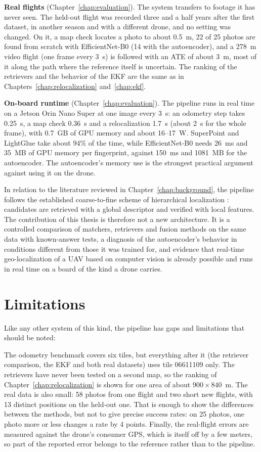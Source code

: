 \documentclass[english, Lau, oneside]{sapthesis}%
\begin{document}
\textbf{Real flights} (Chapter~\ref{chap:evaluation}). The system transfers to footage it has never seen. The held-out flight was recorded three and a half years after the first dataset, in another season and with a different drone, and no setting was changed. On it, a map check locates a photo to about 0.5~m, 22 of 25 photos are found from scratch with EfficientNet-B0 (14 with the autoencoder), and a 278~m video flight (one frame every 3~s) is followed with an ATE of about 3~m, most of it along the path where the reference itself is uncertain. The ranking of the retrievers and the behavior of the EKF are the same as in Chapters~\ref{chap:relocalization} and~\ref{chap:ekf}.

\textbf{On-board runtime} (Chapter~\ref{chap:evaluation}). The pipeline runs in real time on a Jetson Orin Nano Super at one image every 3~s: an odometry step takes 0.25~s, a map check 0.36~s and a relocalization 1.7~s (about 2~s for the whole frame), with 0.7~GB of GPU memory and about 16--17~W. SuperPoint and LightGlue take about 94\% of the time, while EfficientNet-B0 needs 26~ms and 35~MB of GPU memory per fingerprint, against 150~ms and 1081~MB for the autoencoder. The autoencoder's memory use is the strongest practical argument against using it on the drone.

In relation to the literature reviewed in Chapter~\ref{chap:background}, the pipeline follows the established coarse-to-fine scheme of hierarchical localization \citep{sarlin2019hloc}: candidates are retrieved with a global descriptor and verified with local features. The contribution of this thesis is therefore not a new architecture. It is a controlled comparison of matchers, retrievers and fusion methods on the same data with known-answer tests, a diagnosis of the autoencoder's behavior in conditions different from those it was trained for, and evidence that real-time geo-localization of a UAV based on computer vision is already possible and runs in real time on a board of the kind a drone carries.

\clearpage%
\section{Limitations}
\label{sec:limitations}
Like any other system of this kind, the pipeline has gaps and limitations that should be noted:

The odometry benchmark covers six tiles, but everything after it (the retriever comparison, the EKF and both real datasets) uses tile 06611109 only. The retrievers have never been tested on a second map, so the ranking of Chapter~\ref{chap:relocalization} is shown for one area of about $900 \times 840$~m. The real data is also small: 58 photos from one flight and two short new flights, with 13 distinct positions on the held-out one. That is enough to show the differences between the methods, but not to give precise success rates: on 25 photos, one photo more or less changes a rate by 4 points. Finally, the real-flight errors are measured against the drone's consumer GPS, which is itself off by a few meters, so part of the reported error belongs to the reference rather than to the pipeline.
\end{document}
